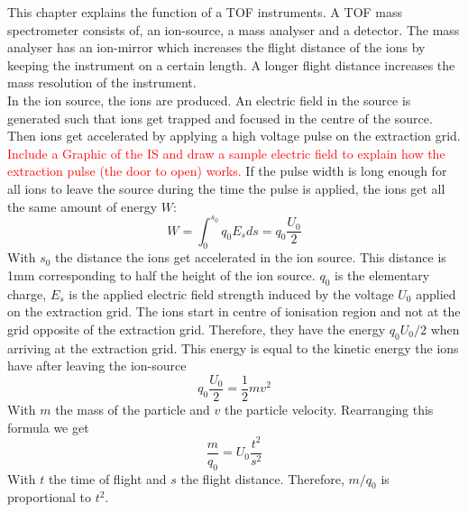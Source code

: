 	
	This chapter explains the function of a TOF instruments. A TOF mass spectrometer consists of, an ion-source, a mass analyser and a detector. The mass analyser has an ion-mirror which increases the flight distance of the ions by keeping the instrument on a certain length. A longer flight distance increases the mass resolution of the instrument.\\%
	In the ion source, the ions are produced. An electric field in the source is generated such that ions get trapped and focused in the centre of the source. Then ions get accelerated by applying a high voltage pulse on the extraction grid. \textcolor{red}{Include a Graphic of the IS and draw a sample electric field to explain how the extraction pulse (the door to open) works.}
	If the pulse width is long enough for all ions to leave the source during the time the pulse is applied, the ions get all the same amount of energy $W$:
	\begin{equation}
		W = \int_{0}^{s_0}q_0 E_s ds = q_0 \frac{U_0}{2}
	\end{equation}
	With $s_0$ the distance the ions get accelerated in the ion source. This distance is 1\si{\milli\metre} corresponding to half the height of the ion source. $q_0$ is the elementary charge, $E_s$ is the applied electric field strength induced by the voltage $U_0$ applied on the extraction grid.
	The ions start in centre of ionisation region and not at the grid opposite of the extraction grid. Therefore, they have the energy $q_0U_0/2$ when arriving at the extraction grid.
	This energy is equal to the kinetic energy the ions have after leaving the ion-source
	\begin{equation}
		q_0 \frac{U_0}{2} = \frac{1}{2}m v^2
	\end{equation}
	With $m$ the mass of the particle and $v$ the particle velocity. Rearranging this formula we get
	\begin{equation}
		\frac{m}{q_0} = U_0\frac{t^2}{s^2}
		\label{eq:m/q}
	\end{equation}
	With $t$ the time of flight and $s$ the flight distance. Therefore, $m/q_0$ is proportional to $t^2$.\\
	

